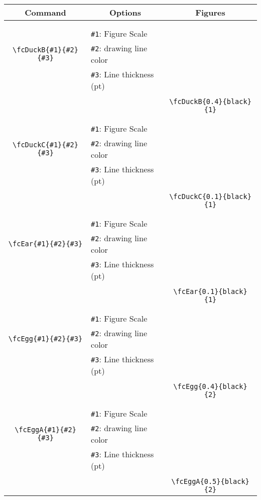 \documentclass[x11names]{article}
\begin{document}
\begin{table}[H]\centering\begin{tabular}{|c|l|c|}\hline {\bf Command}& \multicolumn{1}{c|}{{\bf Options}} & {\bf Figures}\\  \hline	&&\multirow{5}{*}{\fcDuckB{0.4}{black}{1}}\\	&&\\	&\verb|#1|: Figure Scale &\\	\verb|\fcDuckB{#1}{#2}{#3}|&	\verb|#2|: drawing line color &\\	&\verb|#3|: Line thickness (pt) &\\ &&\\&&	\verb|\fcDuckB{0.4}{black}{1}|\\\hline 	
	&&\multirow{5}{*}{\fcDuckC{0.1}{black}{1}}\\	&&\\	&\verb|#1|: Figure Scale &\\	\verb|\fcDuckC{#1}{#2}{#3}|&	\verb|#2|: drawing line color &\\	&\verb|#3|: Line thickness (pt) &\\ &&\\&&	\verb|\fcDuckC{0.1}{black}{1}|\\\hline 	
	&&\multirow{5}{*}{\fcEar{0.1}{black}{1}}\\	&&\\	&\verb|#1|: Figure Scale &\\	\verb|\fcEar{#1}{#2}{#3}|&	\verb|#2|: drawing line color &\\	&\verb|#3|: Line thickness (pt) &\\ &&\\&&	\verb|\fcEar{0.1}{black}{1}|\\\hline 	
	&&\multirow{5}{*}{\fcEgg{0.4}{black}{2}}\\	&&\\	&\verb|#1|: Figure Scale &\\	\verb|\fcEgg{#1}{#2}{#3}|&	\verb|#2|: drawing line color &\\	&\verb|#3|: Line thickness (pt) &\\ &&\\&&	\verb|\fcEgg{0.4}{black}{2}|\\\hline 	
	&&\multirow{5}{*}{\fcEggA{0.5}{black}{2}}\\	&&\\	&\verb|#1|: Figure Scale &\\	\verb|\fcEggA{#1}{#2}{#3}|&	\verb|#2|: drawing line color &\\	&\verb|#3|: Line thickness (pt) &\\ &&\\&&	\verb|\fcEggA{0.5}{black}{2}|\\\hline 	

\end{tabular}
\end{table}
\end{document}
